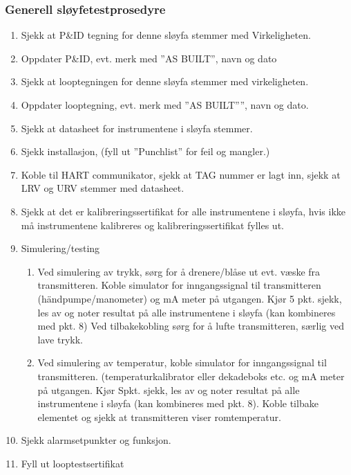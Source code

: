 \subsubsection{Generell sløyfetestprosedyre}
\begin{enumerate}
\item Sjekk at P\&ID tegning for denne sløyfa stemmer med Virkeligheten.
\item Oppdater P\&ID, evt. merk med \textquotedblright AS BUILT\textquotedblright ,
navn og dato
\item Sjekk at looptegningen for denne sløyfa stemmer med virkeligheten.
\item Oppdater looptegning, evt. merk med \textquotedblright AS BUILT\textquotedblright \textquotedblright ,
navn og dato.
\item Sjekk at datasheet for instrumentene i sløyfa stemmer.
\item Sjekk installasjon, (fyll ut \textquotedblright Punchlist\textquotedblright{}
for feil og mangler.)
\item Koble til HART communikator, sjekk at TAG nummer er lagt inn, sjekk
at LRV og URV stemmer med datasheet.
\item Sjekk at det er kalibreringssertifikat for alle instrumentene i sløyfa,
hvis ikke må instrumentene kalibreres og kalibreringssertifikat fylles
ut.
\item Simulering/testing
\begin{enumerate}
\item Ved simulering av trykk, sørg for å drenere/blåse ut evt. væske fra
transmitteren. Koble simulator for inngangssignal til transmitteren
(händpumpe/manometer) og mA meter på utgangen. Kjør 5 pkt. sjekk,
les av og noter resultat på alle instrumentene i sløyfa (kan kombineres
med pkt. 8) Ved tilbakekobling sørg for å lufte transmitteren, særlig
ved lave trykk.
\item Ved simulering av temperatur, koble simulator for inngangssignal til
transmitteren. (temperaturkalibrator eller dekadeboks etc. og mA meter
på utgangen. Kjør Spkt. sjekk, les av og noter resultat på alle instrumentene
i sløyfa (kan kombineres med pkt. 8). Koble tilbake elementet og sjekk
at transmitteren viser romtemperatur.
\end{enumerate}
\item Sjekk alarmsetpunkter og funksjon.
\item Fyll ut looptestsertifikat
\end{enumerate}





